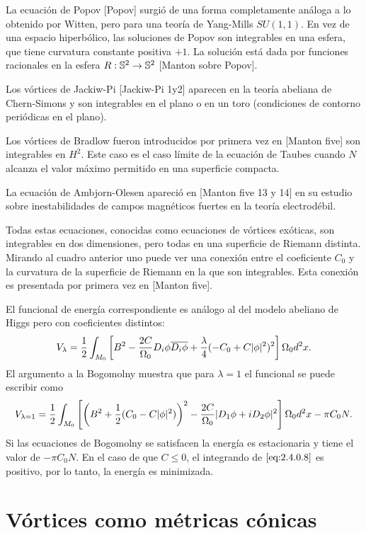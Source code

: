 La ecuación de Popov [Popov] surgió de una forma completamente análoga a lo obtenido por Witten, pero para una teoría de Yang-Mills $SU(1,1)$. En vez de una espacio hiperbólico, las soluciones de Popov son integrables en una esfera, que tiene curvatura constante positiva $+1$. La solución está dada por funciones racionales en la esfera $R:\mathbb{S}^2\rightarrow\mathbb{S}^2$ [Manton sobre Popov].

Los vórtices de Jackiw-Pi [Jackiw-Pi 1y2] aparecen en la teoría abeliana de Chern-Simons y son integrables en el plano o en un toro (condiciones de contorno periódicas en el plano).

Los vórtices de Bradlow fueron introducidos por primera vez en [Manton five] son integrables en $H^2$. Este caso es el caso límite de la ecuación de Taubes cuando $N$ alcanza el valor máximo permitido en una superficie compacta.

La ecuación de Ambjorn-Olesen apareció en [Manton five 13 y 14] en su estudio sobre inestabilidades de campos magnéticos fuertes en la teoría electrodébil.

Todas estas ecuaciones, conocidas como ecuaciones de vórtices exóticas, son integrables en dos dimensiones, pero todas en una superficie de Riemann distinta. Mirando al cuadro anterior uno puede ver una conexión entre el coeficiente $C_0$ y la curvatura de la superficie de Riemann en la que son integrables. Esta conexión es presentada por primera vez en [Manton five].


El funcional de energía correspondiente es análogo al del modelo abeliano de Higgs pero con coeficientes distintos:
\begin{align}
    V_{\lambda} = \frac{1}{2}\int_{M_0}\left[B^2-\frac{2C}{\Omega_0}D_i\phi\overline{D_i\phi}+\frac{\lambda}{4}(-C_0+C|\phi|^2)^2\right]\Omega_0 d^2x. \label{eq:2.4.0.7}
\end{align}
El argumento a la Bogomolny muestra que para $\lambda=1$ el funcional se puede escribir como
\begin{align}
    V_{\lambda=1} = \frac{1}{2}\int_{M_0}\left[\left(B^2+\frac{1}{2}(C_0-C|\phi|^2)\right)^2-\frac{2C}{\Omega_0}|D_1\phi+iD_2\phi|^2\right]\Omega_0 d^2x-\pi C_0 N. \label{eq:2.4.0.8}
\end{align}
Si las ecuaciones de Bogomolny se satisfacen la energía es estacionaria y tiene el valor de $-\pi C_0 N$. En el caso de que $C\leq 0$, el integrando de $\eqref{eq:2.4.0.8}$ es positivo, por lo tanto, la energía es minimizada.

\section{Vórtices como métricas cónicas}

